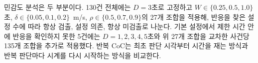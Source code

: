 \begin{revision}
민감도 분석은 두 부분이다. 130건 전체에는 $D=3$초로 고정하고 $W\in\{0.25,0.5,1.0\}$초, $\delta\in\{0.05,0.1,0.2\}$~m/s, $\rho\in\{0.5,0.7,0.9\}$의 27개 조합을 적용해, 반응을 찾은 설정 수에 따라 항상 검출, 설정 의존, 항상 미검출로 나눈다. 기본 설정에서 제한 시간 안에 반응을 확인하지 못한 5건에는 $D=1,2,3,4,5$초와 위 27개 조합을 교차한 사건당 135개 조합을 추가로 적용했다. 반복 CoC는 최초 판단 시각부터 시간을 재는 방식과 반복 판단마다 시계를 다시 시작하는 방식을 비교한다.
\end{revision}
